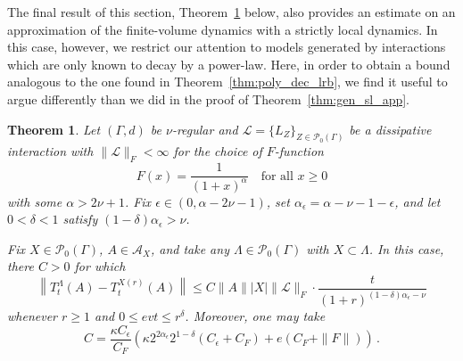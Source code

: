 \documentclass{article}
\newcommand{\<}{\langle}
\renewcommand{\>}{\rangle}
\numberwithin{equation}{section}
\newtheorem{thm}{Theorem}[section]
\theoremstyle{definition}
\begin{document}
The final result of this section, Theorem~\ref{thm:sl_app_poly_dec} below, 
also provides an estimate on an approximation of the finite-volume dynamics with a strictly local dynamics. In this case, however, we restrict our attention to models generated by interactions which are only known to decay by a power-law. Here, in order to obtain a bound analogous to 
the one found in Theorem~\ref{thm:poly_dec_lrb}, we find it useful to argue differently than we did in the proof of
Theorem~\ref{thm:gen_sl_app}. 


%


 \begin{thm}\label{thm:sl_app_poly_dec}
Let $(\Gamma, d)$ be $\nu$-regular and $\mathscr{L} = \{L_Z \}_{Z \in \mathcal{P}_0(\Gamma)}$ be a dissipative interaction with
$\| \mathscr{L} \|_F< \infty$ for the choice of $F$-function
\begin{equation} \label{power_law_F_2}
F(x) = \frac{1}{(1+x)^{\alpha}} \quad \mbox{for all } x \geq 0
\end{equation}
with some $\alpha > 2\nu +1$. Fix $\epsilon \in (0, \alpha - 2 \nu -1)$, set $\alpha_{\epsilon} = \alpha - \nu - 1- \epsilon$, and 
let $0 < \delta < 1$ satisfy $(1- \delta)\alpha_{\epsilon} > \nu$. 

Fix $X \in \mathcal{P}_0(\Gamma)$, $A \in \mathcal{A}_X$, 
and take any $\Lambda \in \mathcal{P}_0(\Gamma)$ with $X \subset \Lambda$. 
In this case, there $C>0$ for which 
\begin{equation} \label{power_law_lrb_2}
 \left\|T^{\Lambda}_t(A)-T^{X(r)}_t(A) \right\|  \leq  C \| A \| |X| \| \mathscr{L} \|_F \cdot \frac{t}{(1+ r)^{(1- \delta) \alpha_{\epsilon} - \nu}}
\end{equation}
whenever $r \geq 1$ and $0 \leq evt \leq r^{\delta}$. Moreover, one may take
\begin{equation} \label{constant_2} 
C =  \frac{\kappa C_{\epsilon}}{C_F}  \left(  \kappa 2^{2\alpha_{\epsilon}} 2^{1- \delta} \left( C_{\epsilon} + C_F \right) + e(C_F + \| F \|) \right) \, .
\end{equation}
    
    \end{thm}
\end{document}
